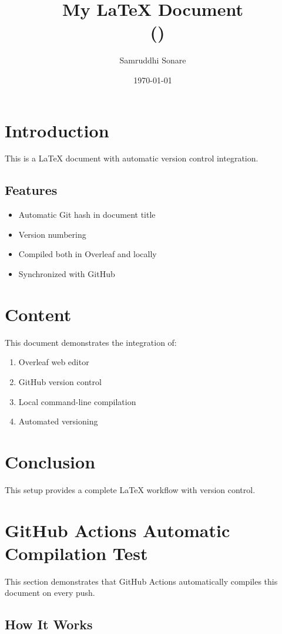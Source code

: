 \documentclass[12pt]{article}
\title{My LaTeX Document \\ \small{\documentversion\ (\githash)}}
\author{Samruddhi Sonare}
\date{\today}
\begin{document}
\maketitle

\section{Introduction}
This is a LaTeX document with automatic version control integration.

\subsection{Features}
\begin{itemize}
    \item Automatic Git hash in document title
    \item Version numbering
    \item Compiled both in Overleaf and locally
    \item Synchronized with GitHub
\end{itemize}

\section{Content}
This document demonstrates the integration of:
\begin{enumerate}
    \item Overleaf web editor
    \item GitHub version control
    \item Local command-line compilation
    \item Automated versioning
\end{enumerate}

\section{Conclusion}
This setup provides a complete LaTeX workflow with version control.
\section{GitHub Actions Automatic Compilation Test}

This section demonstrates that GitHub Actions automatically compiles this document on every push.

\subsection{How It Works}
\end{document}

